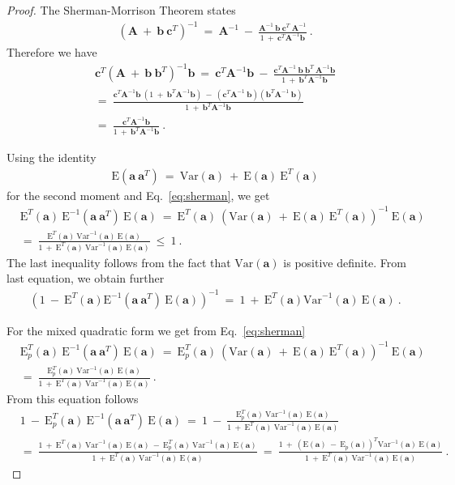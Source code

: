 \documentclass{article}
\newcommand\Ba{\bm{a}}
\newcommand\Bb{\bm{b}}
\newcommand\Bc{\bm{c}}
\newcommand\BA{\bm{A}}
\newcommand\EXP{\mathbf{\mathrm{E}}}
\newcommand\VAR{\mathbf{\mathrm{Var}}}
\begin{document}
\begin{proof}
The Sherman-Morrison Theorem states
\begin{align}
&\left(\BA \ + \ \Bb \ \Bc^T \right)^{-1} \ = \ \BA^{-1} \ - \ \frac{\BA^{-1}
    \ \Bb \ \Bc^T \ \BA^{-1}}{1 \ + \ \Bc^T \BA^{-1} \Bb} \ .
\end{align}
Therefore we have
\begin{align}
\label{eq:sherman}
&\Bc^T \left(\BA \ + \ \Bb \ \Bb^T\right)^{-1} \Bb \ = \ \Bc^T \BA^{-1} \Bb \ - \ \frac{\Bc^T \BA^{-1}
    \ \Bb \ \Bb^T \ \BA^{-1} \Bb}{1 \ + \ \Bb^T \BA^{-1} \Bb} \\ \nonumber
&= \ \frac{\Bc^T \BA^{-1} \Bb \ \left( 1 \ + \ \Bb^T \BA^{-1} \Bb
  \right) \ - \ \left(\Bc^T \BA^{-1}
    \ \Bb\right)\left(\Bb^T \BA^{-1}
    \ \Bb\right)  }{1 \ + \ \Bb^T \BA^{-1} \Bb} \\ \nonumber
&= \ \frac{\Bc^T \BA^{-1} \Bb}{1 \ + \ \Bb^T \BA^{-1} \Bb} \ .
\end{align}

Using the identity
\begin{align}
&\EXP(\Ba \ \Ba^T) \ = \ \VAR(\Ba) \ + \ \EXP(\Ba) \ \EXP^T(\Ba)
\end{align}
for the second moment and Eq.~\eqref{eq:sherman}, we get
\begin{align}
&\EXP^T(\Ba) \ \EXP^{-1}(\Ba \ \Ba^T) \ \EXP(\Ba)
\ = \ \EXP^T(\Ba) \ \left( \VAR(\Ba) \ + \ \EXP(\Ba) \ \EXP^T(\Ba)
\right)^{-1} \ \EXP(\Ba) \\ \nonumber
&= \ \frac{\EXP^T(\Ba) \ \VAR^{-1}(\Ba) \ \EXP(\Ba)}{1 \ + \
  \EXP^T(\Ba) \ \VAR^{-1}(\Ba) \ \EXP(\Ba)}
\ \leq \ 1 \ .
\end{align}
The last inequality follows from the fact that $\VAR(\Ba)$ is positive definite.
From last equation, we obtain further
\begin{align}
&\left( 1 \ - \ \EXP^T(\Ba) \EXP^{-1}(\Ba \ \Ba^T) \ \EXP(\Ba)
\right)^{-1} \ = \ 1 \ + \ \EXP^T(\Ba) \VAR^{-1}(\Ba) \ \EXP(\Ba) \ .
\end{align}

For the mixed quadratic form we get from Eq.~\eqref{eq:sherman}
\begin{align}
&\EXP_p^T(\Ba) \ \EXP^{-1}(\Ba \ \Ba^T) \ \EXP(\Ba)
\ = \ \EXP_p^T(\Ba) \ \left( \VAR(\Ba) \ + \ \EXP(\Ba) \ \EXP^T(\Ba)
\right)^{-1} \ \EXP(\Ba) \\ \nonumber
&= \ \frac{\EXP_p^T(\Ba) \ \VAR^{-1}(\Ba) \ \EXP(\Ba)}{1 \ + \
  \EXP^T(\Ba) \ \VAR^{-1}(\Ba) \ \EXP(\Ba)}
\ .
\end{align}
From this equation follows
\begin{align}
&1 \ - \ \EXP_p^T(\Ba) \ \EXP^{-1}(\Ba \ \Ba^T) \ \EXP(\Ba)
\ = \ 1 \ - \ \frac{\EXP_p^T(\Ba) \ \VAR^{-1}(\Ba) \ \EXP(\Ba)}{1 \ + \
  \EXP^T(\Ba) \ \VAR^{-1}(\Ba) \ \EXP(\Ba)}
 \\ \nonumber
&= \ \frac{1 \ + \  \EXP^T(\Ba) \ \VAR^{-1}(\Ba) \ \EXP(\Ba) \ - \
  \EXP_p^T(\Ba) \ \VAR^{-1}(\Ba) \ \EXP(\Ba)}{1 \ + \ \EXP^T(\Ba) \ \VAR^{-1}(\Ba) \ \EXP(\Ba)}
\ = \ \frac{1 \ + \  \left( \EXP(\Ba) \ - \ \EXP_p(\Ba) \right)^T
  \VAR^{-1}(\Ba) \ \EXP(\Ba) }{1 \ + \ \EXP^T(\Ba) \ \VAR^{-1}(\Ba) \ \EXP(\Ba)}
\ .
\end{align}


\end{proof}
\end{document}
